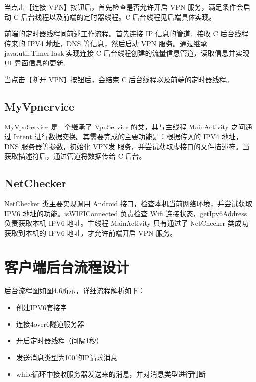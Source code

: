 当点击【连接 VPN】按钮后，首先检查是否允许开启 VPN 服务，满足条件会启动 C 后台线程以及前端的定时器线程。C 后台线程见后端具体实现。

前端的定时器线程同前述工作流程。首先连接 IP 信息的管道，接收 C 后台线程传来的 IPV4 地址，DNS 等信息，然后启动 VPN 服务。通过继承 java.util.TimerTask 实现连接 C 后台线程创建的流量信息管道，读取信息并实现 UI 界面信息的更新。 

当点击【断开 VPN】按钮后，会结束 C 后台线程以及前端的定时器线程。

\subsection{MyVpnervice}
MyVpnService 是一个继承了 VpnService 的类，其与主线程 MainActivity 之间通过 Intent 进行数据交换。其需要完成的主要功能是：根据传入的 IPV4 地址，DNS 服务器等参数，初始化 VPN发 服务，并尝试获取虚接口的文件描述符。当获取描述符后，通过管道将数据传给 C 后台。
\subsection{NetChecker}
NetChecker 类主要实现调用 Android 接口，检查本机当前网络环境，并尝试获取 IPV6 地址的功能。isWIFIConnected 负责检查 Wifi 连接状态，getIpv6Address 负责获取本机 IPV6 地址。主线程 MainActivity 只有通过了 NetChecker 类成功获取到本机的 IPV6 地址，才允许前端开启 VPN 服务。 
\section{客户端后台流程设计}
后台流程图如图4.6所示，详细流程解析如下：
\begin{itemize}
  \item 创建IPV6套接字
  \item 连接4over6隧道服务器
  \item 开启定时器线程（间隔1秒）
  \item 发送消息类型为100的IP请求消息
  \item while循环中接收服务器发送来的消息，并对消息类型进行判断
\end{itemize}

